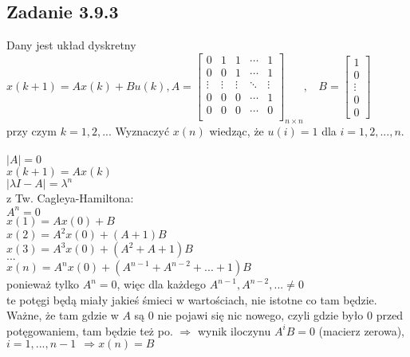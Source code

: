 \subsection*{Zadanie 3.9.3} {\color{darkgray}
	Dany jest układ dyskretny\\
	$x(k+1)=Ax(k)+Bu(k), A=\left[ \begin{array}{ccccc}   
		 0&1&1&\cdots&1 \\
		 0&0&1&\cdots&1  \\
		 \vdots&\vdots&\vdots&\ddots&\vdots  \\
		 0&0&0&\cdots&1  \\
		 0&0&0&\cdots&0  \\
	\end{array}\right]_{n \times n}, \ \ \ \ B=\left[\begin{array}{c}   
		1 \\ 0 \\ \vdots \\ 0 \\ 0
	\end{array}\right]$\\
	przy czym $k=1,2,...$ Wyznaczyć $x(n)$ wiedząc, że $u(i)=1$ dla $i=1,2,...,n$.
}\\\\
$|A|=0$\\
$x(k+1)=Ax(k)$\\
$|\lambda I -A|=\lambda^n$\\
z Tw. Cagleya-Hamiltona:\\
$A^n=0$\\
$x(1)=Ax(0)+B$\\
$x(2)=A^2x(0)+(A+1)B$\\
$x(3)=A^3x(0)+(A^2+A+1)B$\\
$...$\\
$x(n)=A^nx(0)+(A^{n-1}+A^{n-2}+...+1)B$\\
ponieważ tylko $A^n=0$, więc dla każdego $A^{n-1}, A^{n-2},...\neq0$\\
te potęgi będą miały jakieś śmieci w wartościach, nie istotne co tam będzie. Ważne, że tam gdzie w $A$ są $0$ nie pojawi się nic nowego, czyli gdzie było $0$ przed potęgowaniem, tam będzie też po. $\Rightarrow$ wynik iloczynu $A^iB=0$ (macierz zerowa), $i=1,...,n-1 \ \ \Rightarrow \boxed{x(n)=B}$ 

\pagebreak
